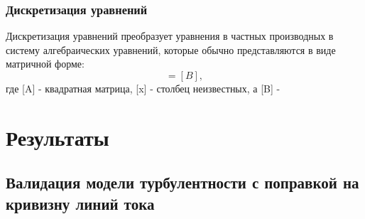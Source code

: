 \documentclass[pdftex,a4paper,12pt]{article}
\begin{document}
		\subsubsection{Дискретизация уравнений}
			Дискретизация уравнений преобразует уравнения в частных производных в систему алгебраических уравнений, которые обычно представляются в виде матричной форме:
			\begin{equation}
				[A][x] = [B],
			\end{equation}
			где [A] - квадратная матрица, [x] - столбец неизвестных, а [B] - 
	\newpage
\newpage
\section{Результаты}
\subsection{Валидация модели турбулентности с поправкой на кривизну линий тока}
\newpage
\end{document}
